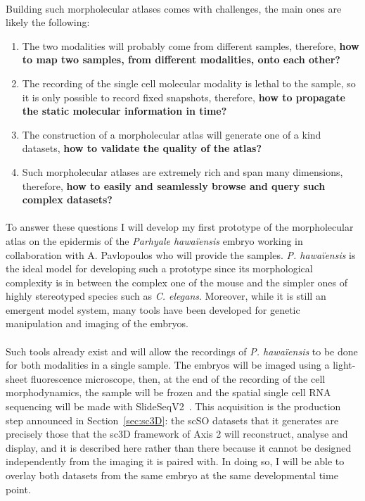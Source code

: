 \paragraph{}Building such morpholecular atlases comes with challenges, the main ones are likely the following:
\begin{enumerate}
   \item The two modalities will probably come from different samples, therefore, \textbf{how to map two samples, from different modalities, onto each other?}
   \item The recording of the single cell molecular modality is lethal to the sample, so it is only possible to record fixed snapshots, therefore, \textbf{how to propagate the static molecular information in time?}
   \item The construction of a morpholecular atlas will generate one of a kind data\-sets, \textbf{how to validate the quality of the atlas?}
   \item Such morpholecular atlases are extremely rich and span many dimensions, therefore, \textbf{how to easily and seamlessly browse and query such complex datasets?}
\end{enumerate}
\paragraph{}To answer these questions I will develop my first prototype of the morpholecular atlas on the epidermis of the \textit{Parhyale hawaïensis} embryo working in collaboration with A. Pavlopoulos who will provide the samples.
\textit{P. hawaïensis} is the ideal model for developing such a prototype since its morphological complexity is in between the complex one of the mouse and the simpler ones of highly stereotyped species such as \textit{C. elegans}.
Moreover, while it is still an emergent model system, many tools have been developed for genetic manipulation and imaging of the embryos.
\paragraph{}Such tools already exist and will allow the recordings of \textit{P. hawaïensis} to be done for both modalities in a single sample.
The embryos will be imaged using a light-sheet fluorescence microscope, then, at the end of the recording of the cell morphodynamics, the sample will be frozen and the spatial single cell RNA sequencing will be made with SlideSeqV2~\cite{Stickels2021}.
This acquisition is the production step announced in Section~\ref{sec:sc3D}: the scSO datasets that it generates are precisely those that the sc3D framework of Axis 2 will reconstruct, analyse and display, and it is described here rather than there because it cannot be designed independently from the imaging it is paired with.
In doing so, I will be able to overlay both datasets from the same embryo at the same developmental time point.
